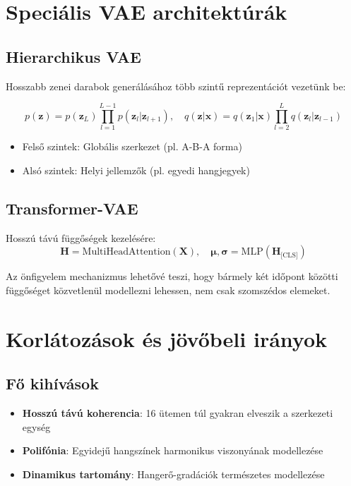 \section{Speciális VAE architektúrák}
\subsection{Hierarchikus VAE}
Hosszabb zenei darabok generálásához több szintű reprezentációt vezetünk be:

\[
p(\mathbf{z}) = p(\mathbf{z}_L) \prod_{l=1}^{L-1} p(\mathbf{z}_l|\mathbf{z}_{l+1}), \quad q(\mathbf{z}|\mathbf{x}) = q(\mathbf{z}_1|\mathbf{x}) \prod_{l=2}^L q(\mathbf{z}_l|\mathbf{z}_{l-1})
\]

\begin{itemize}
    \item Felső szintek: Globális szerkezet (pl. A-B-A forma)
    \item Alsó szintek: Helyi jellemzők (pl. egyedi hangjegyek)
\end{itemize}

\subsection{Transformer-VAE}
Hosszú távú függőségek kezelésére:
\[
\mathbf{H} = \text{MultiHeadAttention}(\mathbf{X}), \quad \boldsymbol{\mu}, \boldsymbol{\sigma} = \text{MLP}(\mathbf{H}_{\text{[CLS]}})
\]

Az önfigyelem mechanizmus lehetővé teszi, hogy bármely két időpont közötti függőséget közvetlenül modellezni lehessen, nem csak szomszédos elemeket.

\section{Korlátozások és jövőbeli irányok}
\subsection{Fő kihívások}
\begin{itemize}
    \item \textbf{Hosszú távú koherencia}: 16 ütemen túl gyakran elveszik a szerkezeti egység
    \item \textbf{Polifónia}: Egyidejű hangszínek harmonikus viszonyának modellezése
    \item \textbf{Dinamikus tartomány}: Hangerő-gradációk természetes modellezése
\end{itemize}

